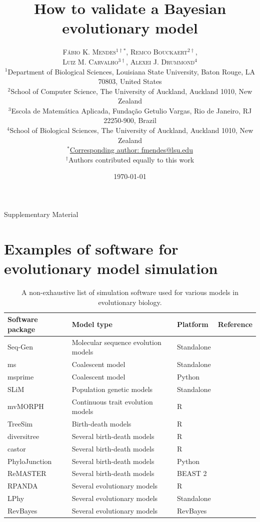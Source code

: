 \documentclass[oneside]{article}
\title{How to validate a Bayesian evolutionary model} %
\author{\textsc{F\'{a}bio K. Mendes$^{1\dagger*}$}, \textsc{Remco Bouckaert$^{2\dagger}$},\\
\textsc{Luiz M. Carvalho$^{3\dagger}$}, \textsc{Alexei J. Drummond$^{4}$} \\
\small $^1$Department of Biological Sciences, Louisiana State University, Baton Rouge, LA 70803, United States\\
\small $^2$School of Computer Science, The University of Auckland, Auckland 1010, New Zealand\\
\small $^3$Escola de Matem\'{a}tica Aplicada, Fundaç\~{a}o Getulio Vargas, Rio de Janeiro, RJ 22250-900, Brazil\\
\small $^4$School of Biological Sciences, The University of Auckland, Auckland 1010, New Zealand\\
\small
\href{mailto:fmendes@lsu.edu}{$^*$Corresponding author: fmendes@lsu.edu}\\
{\small $^\dagger$Authors contributed equally to this work}
}
\date{\today} %
\begin{document}
\maketitle

\begin{center}
    \Large Supplementary Material
\end{center}

\newpage



\section{Examples of software for evolutionary model simulation}

\begin{center}
  \begin{table}[h]
  \caption{A non-exhaustive list of simulation software used for various models in evolutionary biology.}
  \label{suptab:sim}
  \centering
  \begin{tabular}{ p{0.7in} p{1.5in} p{1in} p{1.3in} }
    \hline
    Software package & Model type & Platform & Reference \\
    \hline  
    \rowcolor{gray!10}Seq-Gen & Molecular sequence evolution models & Standalone & \citealp{rambaut97} \\
    ms & Coalescent model & Standalone & \citealp{hudson02}\\
    \rowcolor{gray!10}msprime & Coalescent model & Python & \citealp{kelleher16}\\
    SLiM & Population genetic models & Standalone & \citealp{haller19}\\    
    \rowcolor{gray!10}mvMORPH & Continuous trait evolution models & R & \citealp{clavel15}\\
    TreeSim & Birth-death models & R & \citealp{stadler11}\\
    \rowcolor{gray!10}diversitree & Several birth-death models & R & \citealp{fitzjohn12}\\
    castor & Several birth-death models & R & \citealp{castor}\\
    \rowcolor{gray!10}PhyloJunction & Several birth-death models & Python & \citealp{mendes24}\\
    ReMASTER & Several birth-death models & BEAST 2 & \citealp{vaughan24}\\
    \rowcolor{gray!10}RPANDA & Several evolutionary models & R & \citealp{rpanda}\\
    LPhy & Several evolutionary models & Standalone & \citealp{drummond23}\\
    \rowcolor{gray!10}RevBayes & Several evolutionary models & RevBayes & \citealp{revbayes}\\
    \hline
  \end{tabular}
  \end{table}
\end{center}
\end{document}
